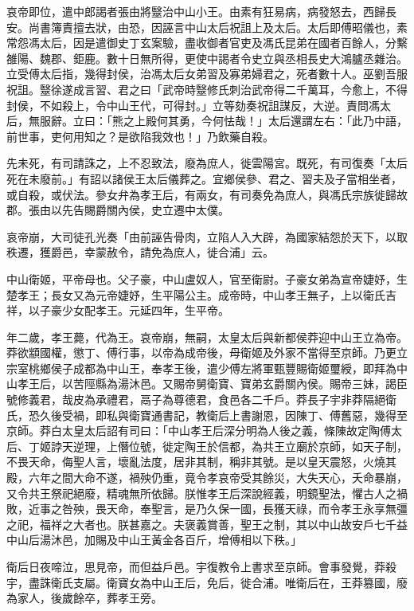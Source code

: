 \begin{pinyinscope}
哀帝即位，遣中郎謁者張由將毉治中山小王。由素有狂易病，病發怒去，西歸長安。尚書簿責擅去狀，由恐，因誣言中山太后祝詛上及太后。太后即傅昭儀也，素常怨馮太后，因是遣御史丁玄案驗，盡收御者官吏及馮氏昆弟在國者百餘人，分繫雒陽、魏郡、鉅鹿。數十日無所得，更使中謁者令史立與丞相長史大鴻臚丞雜治。立受傅太后指，幾得封侯，治馮太后女弟習及寡弟婦君之，死者數十人。巫劉吾服祝詛。毉徐遂成言習、君之曰「武帝時毉修氏刺治武帝得二千萬耳，今愈上，不得封侯，不如殺上，令中山王代，可得封。」立等劾奏祝詛謀反，大逆。責問馮太后，無服辭。立曰：「熊之上殿何其勇，今何怯哉！」太后還謂左右：「此乃中語，前世事，吏何用知之？是欲陷我效也！」乃飲藥自殺。

先未死，有司請誅之，上不忍致法，廢為庶人，徙雲陽宮。既死，有司復奏「太后死在未廢前。」有詔以諸侯王太后儀葬之。宜鄉侯參、君之、習夫及子當相坐者，或自殺，或伏法。參女弁為孝王后，有兩女，有司奏免為庶人，與馮氏宗族徙歸故郡。張由以先告賜爵關內侯，史立遷中太僕。

哀帝崩，大司徒孔光奏「由前誣告骨肉，立陷人入大辟，為國家結怨於天下，以取秩遷，獲爵邑，幸蒙赦令，請免為庶人，徙合浦」云。

中山衛姬，平帝母也。父子豪，中山盧奴人，官至衛尉。子豪女弟為宣帝婕妤，生楚孝王；長女又為元帝婕妤，生平陽公主。成帝時，中山孝王無子，上以衛氏吉祥，以子豪少女配孝王。元延四年，生平帝。

年二歲，孝王薨，代為王。哀帝崩，無嗣，太皇太后與新都侯莽迎中山王立為帝。莽欲顓國權，懲丁、傅行事，以帝為成帝後，母衛姬及外家不當得至京師。乃更立宗室桃鄉侯子成都為中山王，奉孝王後，遣少傅左將軍甄豐賜衛姬璽綬，即拜為中山孝王后，以苦陘縣為湯沐邑。又賜帝舅衛寶、寶弟玄爵關內侯。賜帝三妹，謁臣號修義君，哉皮為承禮君，鬲子為尊德君，食邑各二千戶。莽長子宇非莽隔絕衛氏，恐久後受禍，即私與衛寶通書記，教衛后上書謝恩，因陳丁、傅舊惡，幾得至京師。莽白太皇太后詔有司曰：「中山孝王后深分明為人後之義，條陳故定陶傅太后、丁姬誖天逆理，上僭位號，徙定陶王於信都，為共王立廟於京師，如天子制，不畏天命，侮聖人言，壞亂法度，居非其制，稱非其號。是以皇天震怒，火燒其殿，六年之間大命不遂，禍殃仍重，竟令孝哀帝受其餘災，大失天心，夭命暴崩，又令共王祭祀絕廢，精魂無所依歸。朕惟孝王后深說經義，明鏡聖法，懼古人之禍敗，近事之咎殃，畏天命，奉聖言，是乃久保一國，長獲天祿，而令孝王永享無彊之祀，福祥之大者也。朕甚嘉之。夫褒義賞善，聖王之制，其以中山故安戶七千益中山后湯沐邑，加賜及中山王黃金各百斤，增傅相以下秩。」

衛后日夜啼泣，思見帝，而但益戶邑。宇復教令上書求至京師。會事發覺，莽殺宇，盡誅衛氏支屬。衛寶女為中山王后，免后，徙合浦。唯衛后在，王莽篡國，廢為家人，後歲餘卒，葬孝王旁。


\end{pinyinscope}
